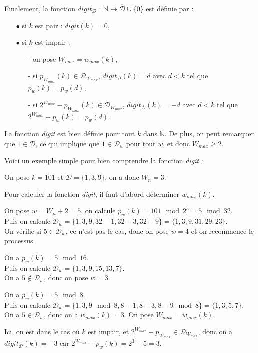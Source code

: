 \documentclass[12pt, a4paper]{memoir}
\begin{document}
Finalement, la fonction $digit_{\mathcal{D}}$ : $\mathbb{N} \rightarrow \overline{\mathcal{D}} \cup \{0\}$ est définie par :

\begin{itemize}
 \item [$\bullet$] si $k$ est pair : $digit(k) = 0$,
 \item [$\bullet$] si $k$ est impair :
 \begin{itemize}
  \item [-] on pose $W_{max} = w_{max}(k)$,
  \item [-] si $p_{W_{max}}(k) \in \mathcal{D}_{W_{max}}$, $digit_{\mathcal{D}}(k) = d$ avec $d < k$ tel que $p_w(k) = p_w(d)$,
  \item [-] si $2^{W_{max}} - p_{W_{max}}(k) \in \mathcal{D}_{W_{max}}$, $digit_{\mathcal{D}}(k) = -d$ avec $d < k$ tel que $2^{W_{max}} - p_w(k) = p_w(d)$.
 \end{itemize} 
\end{itemize}

La fonction \emph{digit} est bien définie pour tout $k$ dans $\mathbb{N}$.
De plus, on peut remarquer que $1 \in \mathcal{D}$, ce qui implique que $1 \in \mathcal{D}_w$
pour tout $w$, et donc $W_{max} \geq 2$.

Voici un exemple simple pour bien comprendre la fonction \emph{digit} :
\begin{Exemple}
 On pose $k = 101$ et $\mathcal{D} = \{1,3,9\}$, on a donc $W_n = 3$.
 
 Pour calculer la fonction \emph{digit}, il faut d'abord déterminer $w_{max}(k)$.
 
 On pose $w = W_n + 2 = 5$, on calcule $p_w (k) = 101 \mod 2^5 = 5 \mod 32$. \\
 Puis on calcule $\overline{\mathcal{D}_w} = \{1,3,9,32-1,32-3,32-9\} = \{1,3,9,31,29,23\}$. \\
 On vérifie si $5 \in \overline{\mathcal{D}_w}$, ce n'est pas le cas, donc on pose $w = 4$ et on recommence
 le processus.
 
 On a $p_w (k) = 5 \mod 16$. \\
 Puis on calcule $\overline{\mathcal{D}_w} = \{1,3,9,15,13,7\}$. \\
 On a $5 \notin \overline{\mathcal{D}_w}$, donc on pose $w = 3$.
 
 On a $p_w (k) = 5 \mod 8$. \\
 Puis on calcule $\overline{\mathcal{D}_w} = \{1,3,9 \mod 8,8-1,8-3,8-9 \mod 8\} = \{1,3,5,7\}$. \\
 On a $5 \in \overline{\mathcal{D}_w}$, donc on a $w_{max}(k) = 3$. On pose $W_{max} = w_{max}(k)$.
 
 Ici, on est dans le cas où $k$ est impair, et $2^{W_{max}} - p_{W_{max}} \in \mathcal{D}_{W_{max}}$,
 donc on a $digit_{\mathcal{D}}(k) = -3$ car $2^{W_{max}} - p_w(k) = 2^3 - 5 = 3$.
\end{Exemple}
\end{document}
